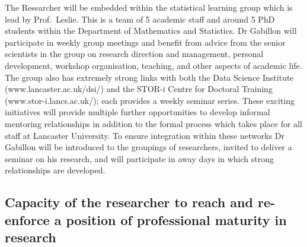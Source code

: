 \documentclass[a4paper,11pt]{article}
\begin{document}
The Researcher will be embedded within the statistical learning group which is lead by Prof.\ Leslie.  This is a team of 5 academic staff and around 5 PhD students within the Department of Mathematics and Statistics.  Dr Gabillon will participate in weekly group meetings and benefit from advice from the senior scientists in the group on research direction and management, personal development, workshop organisation, teaching, and other aspects of academic life.  The group also has extremely strong links with both the Data Science Institute (www.lancaster.ac.uk/dsi/) and the STOR-i Centre for Doctoral Training (www.stor-i.lancs.ac.uk/); each provides a weekly seminar series.  These exciting initiatives will provide multiple further opportunities to develop informal mentoring relationships in addition to the formal process which takes place for all staff at Lancaster University.  To ensure integration within these networks Dr Gabillon will be introduced to the groupings of researchers, invited to deliver a seminar on his research, and will participate in away days in which strong relationships are developed.


\subsection{Capacity of the researcher to reach and re-enforce a position of professional maturity in research}
\label{sec:maturity}

\end{document}
